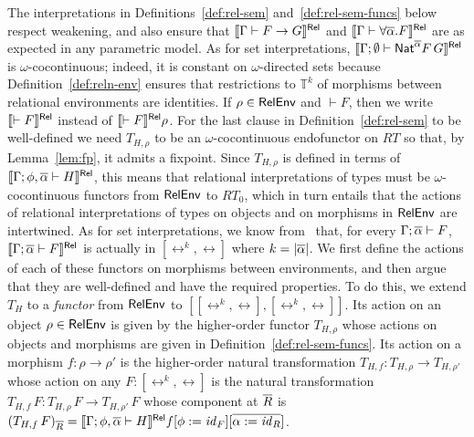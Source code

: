 \documentclass{lmcs}
\theoremstyle{plain}\newtheorem{satz}[thm]{Satz}
\renewcommand{\id}{\mathit{id}}
\begin{document}
{The interpretations in Definitions~\ref{def:rel-sem}
and~\ref{def:rel-sem-funcs} below respect weakening, and also ensure
that $\llbracket{\Gamma \vdash F \to G}\rrbracket^{\mathsf{Rel}}$ and $\llbracket{\Gamma \vdash
  \forall \overline{\alpha}. F}\rrbracket^{\mathsf{Rel}}$ are as expected in any parametric model.  As
for set interpretations, $\llbracket{\Gamma; \emptyset \vdash
  \mathsf{Nat}^{\overline{\alpha}} F\,G}\rrbracket^{\mathsf{Rel}}$ is $\omega$-cocontinuous; indeed, it is
constant on $\omega$-directed sets because
Definition~\ref{def:reln-env} ensures that restrictions to
$\mathbb{T}^k$ of morphisms between relational environments are
identities. If $\rho \in \mathsf{RelEnv}$ and $\vdash F$, then we write
$\llbracket{\vdash F}\rrbracket^{\mathsf{Rel}}$ instead of $\llbracket{\vdash F}\rrbracket^{\mathsf{Rel}}\rho$.  For the last
clause in Definition~\ref{def:rel-sem} to be well-defined we need
$T_{H,\rho}$ to be an $\omega$-cocontinuous endofunctor on $RT$ so
that, by Lemma~\ref{lem:fp}, it admits a fixpoint. Since $T_{H,\rho}$
is defined in terms of $\llbracket{\Gamma;\phi, \overline{\alpha} \vdash H}\rrbracket^{\mathsf{Rel}}$,
this means that relational interpretations of types must be
$\omega$-cocontinuous functors from $\mathsf{RelEnv}$ to $RT_0$, which in turn
entails that the actions of relational interpretations of types on
objects and on morphisms in $\mathsf{RelEnv}$ are intertwined. As for set
interpretations, we know from~\cite{jp19} that, for every $\Gamma;
\overline{\alpha} \vdash F$, $\llbracket{\Gamma; \overline{\alpha} \vdash F}\rrbracket^{\mathsf{Rel}}$ is
actually in $[\rel^k,\rel]$ where $k = |\overline{\alpha}|$. We first define
the actions of each of these functors on morphisms between
environments, and then argue that they are well-defined and have the
required properties. To do this, we extend $T_H$ to a {\em functor}
from $\mathsf{RelEnv}$ to $[[\rel^k,\rel],[\rel^k,\rel]]$. Its action on an
object $\rho \in \mathsf{RelEnv}$ is given by the higher-order functor
$T_{H,\rho}$ whose actions on objects and morphisms are given in
Definition~\ref{def:rel-sem-funcs}. Its action on a morphism $f : \rho
\to \rho'$ is the higher-order natural transformation $T_{H,f} :
T_{H,\rho} \to T_{H,\rho'}$ whose action on any $F : [\rel^k,\rel]$ is
the natural transformation $T_{H,f}\, F : T_{H,\rho}\, F \to
T_{H,\rho'}\, F$ whose component at $\overline{R}$ is $(T_{H,f}\,
F)_{\ol{R}} = \relsem{\Gamma; \phi,\ol{\alpha} \vdash H}f[\phi :=
  \id_F][\ol{\alpha := \id_R}]$.

}
\end{document}
